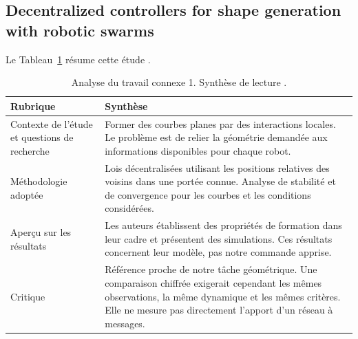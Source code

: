 \subsection{Decentralized controllers for shape generation with robotic swarms}
Le Tableau~\ref{tab:travail-connexe-1} résume cette étude \cite{hsieh2008}.
\begin{table}[htbp]
\caption[Analyse du travail connexe 1]{Analyse du travail connexe 1. Synthèse de lecture \cite{hsieh2008}.}
\label{tab:travail-connexe-1}
\centering
\begin{tabularx}{\textwidth}{p{3.7cm}X}
\toprule Rubrique & Synthèse\\\midrule
Contexte de l’étude et questions de recherche & Former des courbes planes par des interactions locales. Le problème est de relier la géométrie demandée aux informations disponibles pour chaque robot.\\[5pt]
Méthodologie adoptée & Lois décentralisées utilisant les positions relatives des voisins dans une portée connue. Analyse de stabilité et de convergence pour les courbes et les conditions considérées.\\[5pt]
Aperçu sur les résultats & Les auteurs établissent des propriétés de formation dans leur cadre et présentent des simulations. Ces résultats concernent leur modèle, pas notre commande apprise.\\[5pt]
Critique & Référence proche de notre tâche géométrique. Une comparaison chiffrée exigerait cependant les mêmes observations, la même dynamique et les mêmes critères. Elle ne mesure pas directement l’apport d’un réseau à messages.\\[5pt]
\bottomrule\end{tabularx}
\end{table}


